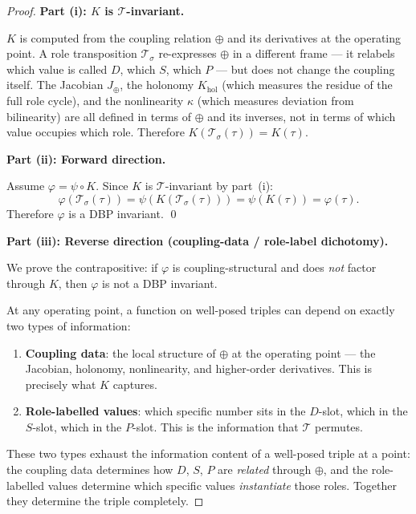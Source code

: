 \documentclass[12pt,a4paper]{article}
\theoremstyle{definition}
\theoremstyle{plain}
\theoremstyle{remark}
\newcommand{\T}{\mathcal{T}}
\begin{document}
\begin{proof}

\medskip
\noindent\textbf{Part (i): $K$ is $\T$-invariant.}

$K$ is computed from the coupling relation $\oplus$ and its derivatives at the operating point. A role transposition $\T_\sigma$ re-expresses $\oplus$ in a different frame --- it relabels which value is called $D$, which $S$, which $P$ --- but does not change the coupling itself. The Jacobian $J_\oplus$, the holonomy $K_{\mathrm{hol}}$ (which measures the residue of the full role cycle), and the nonlinearity $\kappa$ (which measures deviation from bilinearity) are all defined in terms of $\oplus$ and its inverses, not in terms of which value occupies which role. Therefore $K(\T_\sigma(\tau)) = K(\tau)$.

\medskip
\noindent\textbf{Part (ii): Forward direction.}

Assume $\varphi = \psi \circ K$. Since $K$ is $\T$-invariant by part~(i):
\[
\varphi(\T_\sigma(\tau)) = \psi(K(\T_\sigma(\tau))) = \psi(K(\tau)) = \varphi(\tau).
\]
Therefore $\varphi$ is a DBP invariant. \qed

\medskip
\noindent\textbf{Part (iii): Reverse direction (coupling-data / role-label dichotomy).}

We prove the contrapositive: if $\varphi$ is coupling-structural and does \emph{not} factor through $K$, then $\varphi$ is not a DBP invariant.

At any operating point, a function on well-posed triples can depend on exactly two types of information:

\begin{enumerate}[label=(\alph*),nosep]
\item \textbf{Coupling data}: the local structure of $\oplus$ at the operating point --- the Jacobian, holonomy, nonlinearity, and higher-order derivatives. This is precisely what $K$ captures.

\item \textbf{Role-labelled values}: which specific number sits in the $D$-slot, which in the $S$-slot, which in the $P$-slot. This is the information that $\T$ permutes.
\end{enumerate}

These two types exhaust the information content of a well-posed triple at a point: the coupling data determines how $D$, $S$, $P$ are \emph{related} through $\oplus$, and the role-labelled values determine which specific values \emph{instantiate} those roles. Together they determine the triple completely.


\end{proof}
\end{document}
